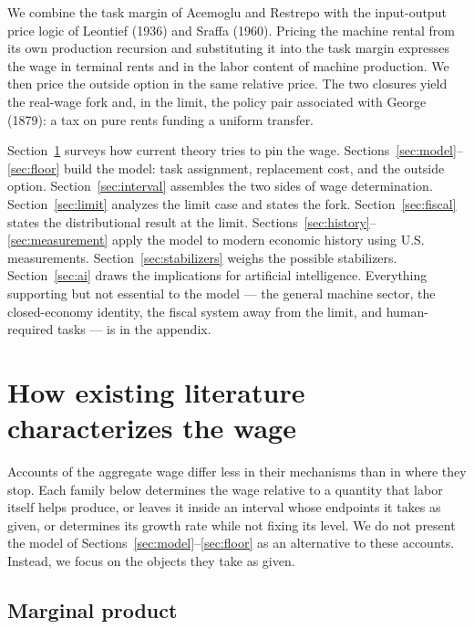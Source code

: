 \documentclass[12pt]{article}
\theoremstyle{plain}
\begin{document}
We combine the task margin of Acemoglu and Restrepo with the input-output price logic of Leontief (1936) and Sraffa (1960). Pricing the machine rental from its own production recursion and substituting it into the task margin expresses the wage in terminal rents and in the labor content of machine production. We then price the outside option in the same relative price. The two closures yield the real-wage fork and, in the limit, the policy pair associated with George (1879): a tax on pure rents funding a uniform transfer.

Section~\ref{sec:accounts} surveys how current theory tries to pin the wage.
Sections~\ref{sec:model}--\ref{sec:floor} build the model: task assignment,
replacement cost, and the outside option. Section~\ref{sec:interval} assembles
the two sides of wage determination. Section~\ref{sec:limit} analyzes the limit
case and states the fork. Section~\ref{sec:fiscal} states the distributional result at the limit.
Sections~\ref{sec:history}--\ref{sec:measurement} apply the model to modern
economic history using U.S. measurements. Section~\ref{sec:stabilizers} weighs
the possible stabilizers. Section~\ref{sec:ai} draws the implications for
artificial intelligence. Everything supporting but not essential to the model
--- the general machine sector, the closed-economy identity, the fiscal system
away from the limit, and human-required tasks --- is in the appendix.

\section{How existing literature characterizes the wage}\label{sec:accounts}

Accounts of the aggregate wage differ less in their mechanisms than in where they stop. Each family below determines the wage relative to a quantity that labor itself helps produce, or leaves it inside an interval whose endpoints it takes as given, or determines its growth rate while not fixing its level. We do not present the model of Sections~\ref{sec:model}--\ref{sec:floor} as an alternative to these accounts. Instead, we focus on the objects they take as given.

\subsection{Marginal product}\label{sec:marginal-product}
\end{document}
